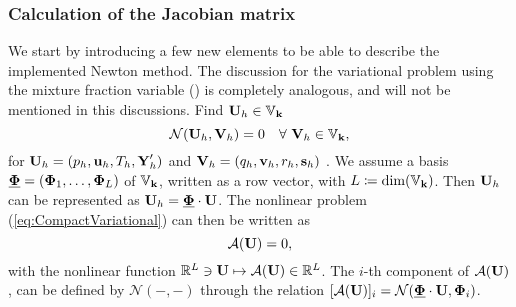 \subsubsection{Calculation of the Jacobian matrix}
We start by introducing a few new elements to be able to describe the implemented Newton method.
The discussion for the variational problem using the mixture fraction variable () is completely analogous, and will not be mentioned in this discussions.
Find $\textbf{U}_h \in \mathbb{V}_{\textbf{k}}$
\begin{equation}
	\mathcal{N}(\textbf{U}_h,\textbf{V}_h) = 0 \quad \forall \ \textbf{V}_h \in \mathbb{V}_{\textbf{k}} ,
	\label{eq:CompactVariational}
\end{equation}
for
$\textbf{U}_h = (p_h,\textbf{u}_h, T_h, \textbf{Y}'_h)$ and
$\textbf{V}_h = (q_h,\textbf{v}_h, r_h, \mathbf{s}_h)$
. We assume a basis
$\underline{\boldsymbol{\Phi}} = ( \boldsymbol{\Phi}_1, \ldots , \boldsymbol{\Phi}_L )$ of $\mathbb{V}_{\textbf{k}}$,
written as a row vector, with $L \coloneqq \textrm{dim}(\mathbb{V}_{\textbf{k}})$.
Then $\textbf{U}_h$ can be represented as
$ \textbf{U}_h =  \underline{ \boldsymbol{\Phi} } \cdot \textbf{U} $.
The nonlinear problem (\ref{eq:CompactVariational}) can then be written as
\begin{equation}
	\mathcal{A}(\textbf{U}) = 0 ,
	\label{Eq:nonLinSystem}
\end{equation}
with the nonlinear function
$\mathbb{R}^L \ni \textbf{U} \mapsto \mathcal{A}(\textbf{U}) \in \mathbb{R}^L$.
The $i$-th component of $ \mathcal{A}(\textbf{U})$, can be defined by $\mathcal{N}(-,-)$ through the relation
$[\mathcal{A}(\textbf{U})]_i = \mathcal{N}( \underline{ \boldsymbol{\Phi} } \cdot \textbf{U} , \boldsymbol{\Phi}_i)$.

